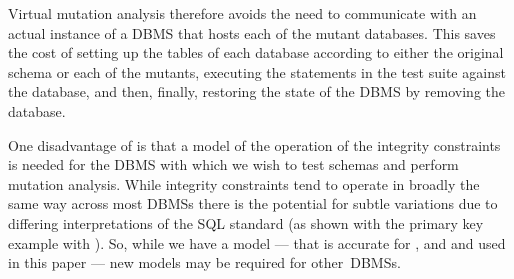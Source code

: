 Virtual mutation analysis therefore avoids the need to communicate with an actual instance of a DBMS that hosts each of the mutant databases. This saves the cost of setting up the tables of each database according to either the original schema or each of the mutants, executing the \INSERT statements in the test suite against the database, and then, finally, restoring the state of the DBMS by removing the database.

One disadvantage of \vma is that a model of the operation of the integrity constraints is needed for the DBMS with which
we wish to test schemas and perform mutation analysis. While integrity constraints tend to operate in broadly the same
way across most DBMSs there is the potential for subtle variations due to differing interpretations of the SQL standard
(as shown with the primary key example with \SQLite). So, while we have a model --- that is accurate for \HyperSQL,
\Postgres and \SQLite and used in this paper --- new models may be required for \mbox{other DBMSs}.



